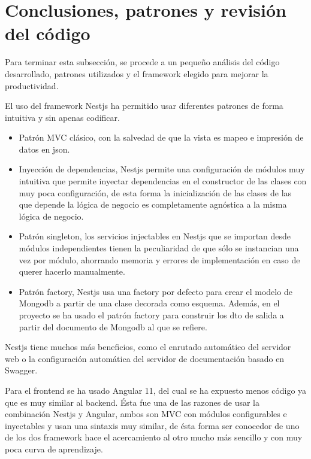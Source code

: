 \section{Conclusiones, patrones y revisión del código}
Para terminar esta subsección, se procede a un pequeño análisis del código desarrollado, patrones utilizados y el framework elegido para mejorar la productividad.
\vspace{1em}
\par El uso del framework Nestjs ha permitido usar diferentes patrones de forma intuitiva y sin apenas codificar.
\begin{itemize}
    \item Patrón MVC clásico, con la salvedad de que la vista es mapeo e impresión de datos en json.
    \item Inyección de dependencias, Nestjs permite una configuración de módulos muy intuitiva que permite inyectar dependencias en el constructor de las clases con muy poca configuración, de esta forma la inicialización de las clases de las que depende la lógica de negocio es completamente agnóstica a la misma lógica de negocio.
    \item Patrón singleton, los servicios injectables en Nestjs que se importan desde módulos independientes tienen la peculiaridad de que sólo se instancian una vez por módulo, ahorrando memoria y errores de implementación en caso de querer hacerlo manualmente.
    \item Patrón factory, Nestjs usa una factory por defecto para crear el modelo de Mongodb a partir de una clase decorada como esquema. Además, en el proyecto se ha usado el patrón factory para construir los dto de salida a partir del documento de Mongodb al que se refiere.
\end{itemize}
\vspace{1em}
\par Nestjs tiene muchos más beneficios, como el enrutado automático del servidor web o la configuración automática del servidor de documentación basado en Swagger.
\vspace{1em}
\par Para el frontend se ha usado Angular 11, del cual se ha expuesto menos código ya que es muy similar al backend. Ésta fue una de las razones de usar la combinación Nestjs y Angular, ambos son MVC con módulos configurables e inyectables y usan una sintaxis muy similar, de ésta forma ser conocedor de uno de los dos framework hace el acercamiento al otro mucho más sencillo y con muy poca curva de aprendizaje.
\vspace{1em}

